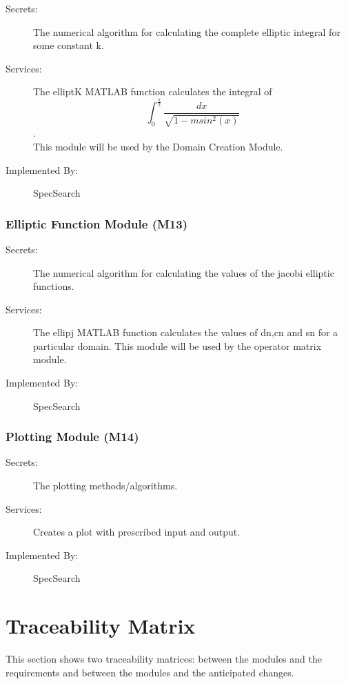 \documentclass[12pt, titlepage]{article}
\begin{document}
\begin{description}
	\item[Secrets:] The numerical algorithm for calculating the complete 
	elliptic integral for some constant k. 
	\item[Services:] The elliptK MATLAB function calculates the integral of $$ 
	\int_{0}^{\frac{\pi}{2}} \frac{dx}{\sqrt{1-msin^{2}(x)}}$$. \\ 
	This module will be used by the Domain Creation Module. 
	\item[Implemented By:] SpecSearch
\end{description} 

\subsubsection{Elliptic Function Module (M13)} 

\begin{description}
	\item[Secrets:] The numerical algorithm for calculating the values of the 
	jacobi elliptic functions. 
	\item[Services:] The ellipj MATLAB function calculates the values of dn,cn 
	and sn for a particular domain. This module will be used by the operator 
	matrix module. 
	\item[Implemented By:] SpecSearch
\end{description} 

\subsubsection{Plotting Module (M14)} 

\begin{description}
	\item[Secrets:] The plotting methods/algorithms.
	\item[Services:] Creates a plot with prescribed input and output.  
	\item[Implemented By:] SpecSearch
\end{description}

\section{Traceability Matrix} \label{SecTM}

This section shows two traceability matrices: between the modules and the
requirements and between the modules and the anticipated changes.
\end{document}
